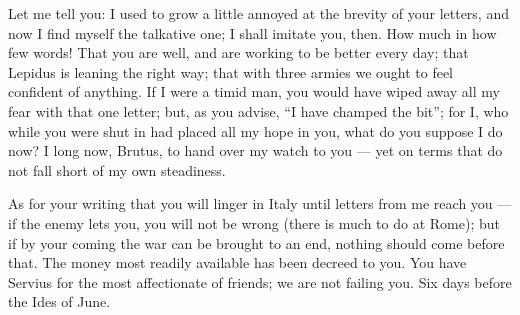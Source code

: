 

 Let me tell you: I used to grow a little annoyed at the brevity of your letters, and now I find myself the talkative one; I shall imitate you, then. How much in how few words! That you are well, and are working to be better every day; that Lepidus is leaning the right way; that with three armies we ought to feel confident of anything. If I were a timid man, you would have wiped away all my fear with that one letter; but, as you advise, ``I have champed the bit''; for I, who while you were shut in had placed all my hope in you, what do you suppose I do now? I long now, Brutus, to hand over my watch to you --- yet on terms that do not fall short of my own steadiness.

 As for your writing that you will linger in Italy until letters from me reach you --- if the enemy lets you, you will not be wrong (there is much to do at Rome); but if by your coming the war can be brought to an end, nothing should come before that. The money most readily available has been decreed to you. You have Servius for the most affectionate of friends; we are not failing you. Six days before the Ides of June.
